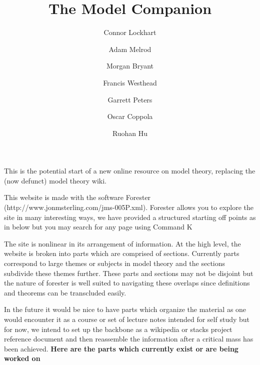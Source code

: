 \documentclass[a4paper]{article}
\title{The Model Companion}
\date{}
\author{Connor Lockhart \and Adam Melrod \and Morgan Bryant \and Francis Westhead \and Garrett Peters \and Oscar Coppola \and Ruohan Hu}
\begin{document}
\maketitle
\par{This is the potential start of a new online resource on model theory, replacing the (now defunct) model theory wiki.}\par{This website is made with the software Forester (http://www.jonmsterling.com/jms-005P.xml). Forester allows you to explore the site in many interesting ways, we have provided a structured starting off points as in below but you may search for any page using Command K}\par{The site is nonlinear in its arrangement of information. At the high level, the website is broken into parts which are comprised of sections. Currently parts correspond to large themes or subjects in model theory and the sections subdivide these themes further. These parts and sections may not be disjoint but the nature of forester is well suited to navigating these overlaps since definitions and theorems can be transcluded easily. }\par{In the future it would be nice to have parts which organize the material as one would encounter it as a course or set of lecture notes intended for self study but for now, we intend to set up the backbone as a wikipedia or stacks project reference document and then reassemble the information after a critical mass has been achieved. }\textbf{Here are the parts which currently exist or are being worked on}
  
\end{document}
